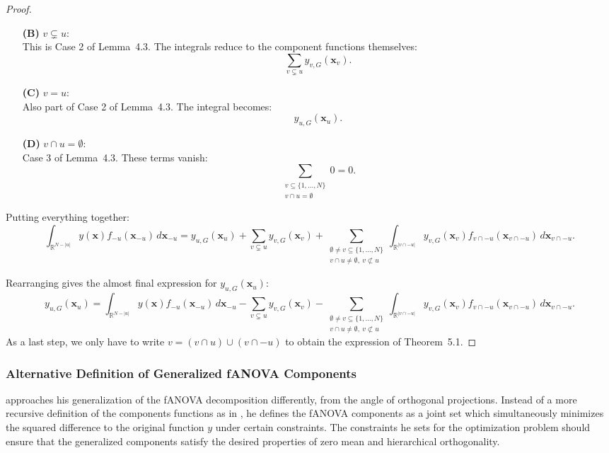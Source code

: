 \begin{proof}
\begin{itemize}
  \item[\textbf{(B)}] \( v \subsetneq u \): \\
  This is Case 2 of Lemma~4.3. The integrals reduce to the component functions themselves:
  \[
  \sum_{v \subsetneq u} y_{v,G}(\mathbf{x}_v).
  \]

  \item[\textbf{(C)}] \( v = u \): \\
  Also part of Case 2 of Lemma~4.3. The integral becomes:
  \[
  y_{u,G}(\mathbf{x}_u).
  \]

  \item[\textbf{(D)}] \( v \cap u = \emptyset \): \\
  Case 3 of Lemma~4.3. These terms vanish:
  \[
  \sum_{\substack{v \subseteq \{1,\dots,N\} \\ v \cap u = \emptyset}} 0 = 0.
  \]
\end{itemize}

Putting everything together:
\[
\int_{\mathbb{R}^{N - |u|}} y(\mathbf{x}) f_{-u}(\mathbf{x}_{-u}) \, d\mathbf{x}_{-u}
= y_{u,G}(\mathbf{x}_u)
+ \sum_{v \subsetneq u} y_{v,G}(\mathbf{x}_v)
+ \sum_{\substack{\emptyset \ne v \subseteq \{1,\dots,N\} \\ v \cap u \ne \emptyset,\ v \not\subset u}} 
\int_{\mathbb{R}^{|v \cap -u|}} y_{v,G}(\mathbf{x}_v) f_{v \cap -u}(\mathbf{x}_{v \cap -u}) \, d\mathbf{x}_{v \cap -u}.
\]

Rearranging gives the almost final expression for \( y_{u,G}(\mathbf{x}_u) \):
\[
y_{u,G}(\mathbf{x}_u)
= \int_{\mathbb{R}^{N - |u|}} y(\mathbf{x}) f_{-u}(\mathbf{x}_{-u}) \, d\mathbf{x}_{-u}
- \sum_{v \subsetneq u} y_{v,G}(\mathbf{x}_v)
- \sum_{\substack{\emptyset \ne v \subseteq \{1,\dots,N\} \\ v \cap u \ne \emptyset,\ v \not\subset u}} 
\int_{\mathbb{R}^{|v \cap -u|}} y_{v,G}(\mathbf{x}_v) f_{v \cap -u}(\mathbf{x}_{v \cap -u}) \, d\mathbf{x}_{v \cap -u}.
\]
As a last step, we only have to write \( v = (v \cap u) \cup (v \cap -u) \) to obtain the expression of Theorem~5.1.

\end{proof}

\subsubsection{Alternative Definition of Generalized fANOVA Components}
\cite{hooker2007} approaches his generalization of the fANOVA decomposition differently, from the angle of orthogonal projections. Instead of a more recursive definition of the components functions as in \cite{rahman2014}, he defines the fANOVA components as a joint set which simultaneously minimizes the squared difference to the original function $y$ under certain constraints.
The constraints he sets for the optimization problem should ensure that the generalized components satisfy the desired properties of zero mean and hierarchical orthogonality.

